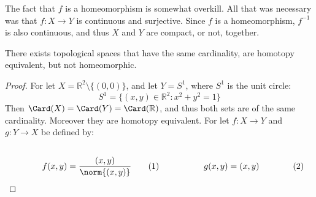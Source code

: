 \documentclass[crop=false,class=book,oneside]{standalone}                      %
\begin{document}
            The fact that $f$ is a homeomorphism is somewhat overkill.
            All that was necessary was that $f:X\rightarrow{Y}$
            is continuous and surjective.
            Since $f$ is a homeomorphism, $f^{-1}$ is also
            continuous, and thus $X$ and $Y$ are compact, or not, together.
            \begin{theorem}
                \label{theorem:surgery_theory_Homotopy_%
                       equivalance_of_plane_without_point_and_unit_%
                       disc_but_not_homeomorphic}
                There exists topological spaces that have the same
                cardinality, are homotopy equivalent, but not
                homeomorphic.
            \end{theorem}
            \begin{proof}
                For let $X=\mathbb{R}^{2}\setminus\{(0,0)\}$,
                and let $Y=S^{1}$, where $S^{1}$ is the unit circle:
                \begin{equation}
                    S^{1}=\{(x,y)\in\mathbb{R}^{2}:x^{2}+y^{2}=1\}
                \end{equation}
                Then $\Card(X)=\Card(Y)=\Card(\mathbb{R})$, and thus
                both sets are of the same cardinality. Moreover they
                are homotopy equivalent. For let $f:{X}\rightarrow{Y}$ and
                $g:{Y}\rightarrow{X}$ be defined by:
                \par
                \begin{subequations}
                    \begin{minipage}[b]{0.49\textwidth}
                        \centering
                        \begin{equation}
                            f(x,y)=\frac{(x,y)}{\norm{(x,y)}}
                        \end{equation}
                    \end{minipage}
                    \hfill
                    \begin{minipage}[b]{0.49\textwidth}
                        \centering
                        \begin{equation}
                            g(x,y)=(x,y)
                        \end{equation}
                    \end{minipage}
                \end{subequations}
                \par\hfill\par

\end{proof}
\end{document}
